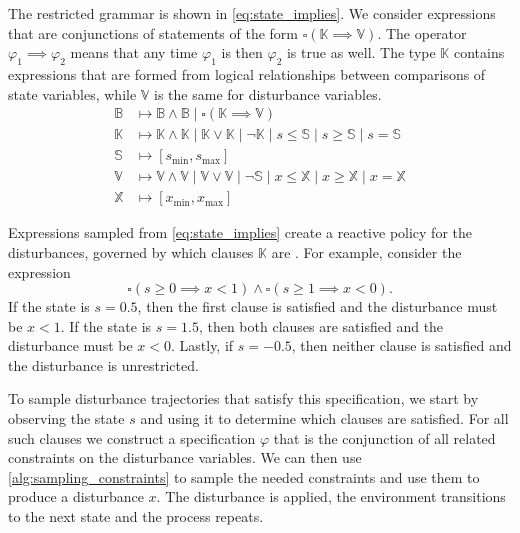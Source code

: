 The restricted grammar is shown in \cref{eq:state_implies}. We consider expressions that are conjunctions of statements of the form $\square (\mathbb{K} \implies \mathbb{V})$. The operator $\varphi_1 \implies \varphi_2$ means that any time $\varphi_1$ is \True{} then $\varphi_2$ is true as well. The type $\mathbb{K}$ contains expressions that are formed from logical relationships between comparisons of state variables, while $\mathbb{V}$ is the same for disturbance variables. 
\begin{equation}
\begin{split}
    \mathbb{B} &\mapsto \mathbb{B} \land \mathbb{B} \mid \square (\mathbb{K} \implies \mathbb{V}) \\
    \mathbb{K} &\mapsto \mathbb{K} \land \mathbb{K} \mid \mathbb{K} \lor \mathbb{K} \mid \neg \mathbb{K} \mid s \leq \mathbb{S} \mid s \geq \mathbb{S} \mid s = \mathbb{S} \\
    \mathbb{S} &\mapsto [s_{\min},s_{\max}] \\
    \mathbb{V} &\mapsto \mathbb{V} \land \mathbb{V} \mid \mathbb{V} \lor \mathbb{V} \mid \neg \mathbb{S} \mid x \leq \mathbb{X} \mid x \geq \mathbb{X} \mid x = \mathbb{X} \\
    \mathbb{X} &\mapsto [x_{\min},x_{\max}]
\end{split}\label{eq:state_implies}
\end{equation}

Expressions sampled from \cref{eq:state_implies} create a reactive policy for the disturbances, governed by which clauses $\mathbb{K}$ are \True{}. For example, consider the expression
\begin{equation}
    \square ( s \geq 0 \implies x < 1) \land \square ( s  \geq 1 \implies x < 0) \text{.}
\end{equation}
If the state is $s=0.5$, then the first clause is satisfied and the disturbance must be $x < 1$. If the state is $s=1.5$, then both clauses are satisfied and the disturbance must be $x < 0$. Lastly, if $s = -0.5$, then neither clause is satisfied and the disturbance is unrestricted. 

To sample disturbance trajectories that satisfy this specification, we start by observing the state $s$ and using it to determine which clauses are satisfied. For all such clauses we construct a specification $\varphi$ that is the conjunction of all related constraints on the disturbance variables. We can then use \cref{alg:sampling_constraints} to sample the needed constraints and use them to produce a disturbance $x$. The disturbance is applied, the environment transitions to the next state and the process repeats.



